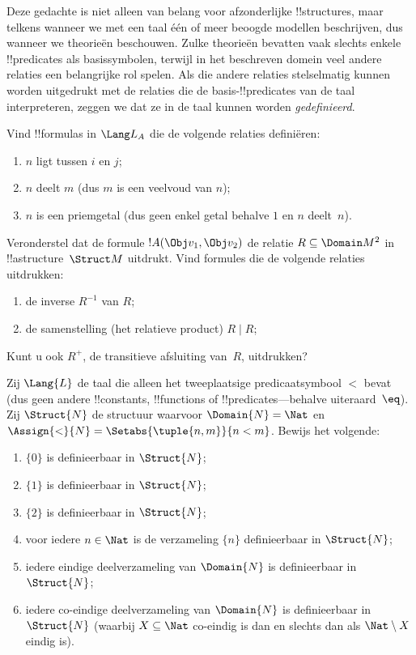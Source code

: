 \documentclass[../../../include/open-logic-section]{subfiles}
\begin{document}
\begin{explain}
Deze gedachte is niet alleen van belang voor afzonderlijke
!!{structure}s, maar telkens wanneer we met een taal één of meer
beoogde modellen beschrijven, dus wanneer we theorieën beschouwen.
Zulke theorieën bevatten vaak slechts enkele !!{predicate}s als
basissymbolen, terwijl in het beschreven domein veel andere relaties
een belangrijke rol spelen. Als die andere relaties stelselmatig
kunnen worden uitgedrukt met de relaties die de basis-!!{predicate}s
van de taal interpreteren, zeggen we dat ze in de taal kunnen worden
\emph{gedefinieerd}.
\end{explain}

\begin{prob}
Vind !!{formula}s in $\Lang L_A$ die de volgende relaties definiëren:
\begin{enumerate}
\item $n$ ligt tussen $i$ en $j$;
\item $n$ deelt $m$ (dus $m$ is een veelvoud van $n$);
\item $n$ is een priemgetal (dus geen enkel getal behalve $1$ en $n$
  deelt~$n$).
\end{enumerate}
\end{prob}

\begin{prob}
Veronderstel dat de formule $!A(\Obj v_1, \Obj v_2)$ de relatie $R
\subseteq \Domain M^2$ in !!a{structure}~$\Struct M$ uitdrukt. Vind
formules die de volgende relaties uitdrukken:
\begin{enumerate}
\item de inverse $R^{-1}$ van $R$;
\item de samenstelling (het relatieve product) $R \mid R$;
\end{enumerate}
Kunt u ook $R^+$, de transitieve afsluiting van~$R$, uitdrukken?
\end{prob}

\begin{prob}
Zij $\Lang{L}$ de taal die alleen het tweeplaatsige predicaatsymbool
$<$ bevat (dus geen andere !!{constant}s, !!{function}s of
!!{predicate}s---behalve uiteraard~$\eq$). Zij $\Struct{N}$ de
structuur waarvoor $\Domain{N} = \Nat$ en
$\Assign{<}{N} = \Setabs{\tuple{n,m}}{n < m}$. Bewijs het volgende:
\begin{enumerate}
\item $\{ 0 \}$ is definieerbaar in $\Struct{N}$;
\item $\{ 1 \}$ is definieerbaar in $\Struct{N}$;
\item $\{ 2 \}$ is definieerbaar in $\Struct{N}$;
\item voor iedere $n \in \Nat$ is de verzameling $\{ n \}$
  definieerbaar in $\Struct{N}$;
\item iedere eindige deelverzameling van $\Domain{N}$ is definieerbaar
  in $\Struct{N}$;
\item iedere co-eindige deelverzameling van $\Domain{N}$ is
  definieerbaar in $\Struct{N}$ (waarbij $X \subseteq \Nat$
  co-eindig is dan en slechts dan als $\Nat \setminus X$ eindig is).
\end{enumerate}
\end{prob}
\end{document}
